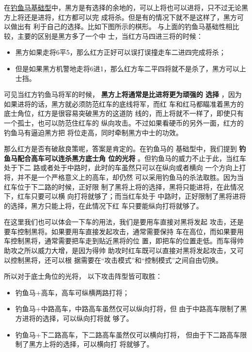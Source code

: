 \documentclass[a5paper,twoside]{book}
\begin{document}
在\hyperref[sec-3-1]{钓鱼马基础型}中，黑方是有选择的余地的，可以上将也可以进将，只不过无论黑方上将还是进将，红方都可以完
成将杀。但是有的情况下就不是这样了，黑方可以做出有
利于自己的选择。比如下图所示的棋形。
与上面的钓鱼马基础性相比较，主要的区别是黑方多了一个中
士，当红方马四进三将的时候：
\begin{itemize}
\item 黑方如果走将6平5，那么红方正好可以误打误撞走车二进四完成将杀；
\item 但是如果黑方机警地走将6进1，那么红方车二平四将就不是杀了，黑方可以上士挡。
\end{itemize}

可见当红方钓鱼马将军的时候， \textbf{黑方上将通常是比进将更为顽强的
选择} ，因为如果进将的话，黑方就必须防范红车的底线将军，而红
车和红马都瞄准着黑方的底士角位，红方是很容易突破黑方的这道防
线的，而上将就不一样了，即使只有一个孤士，也可以防范住红车的
纵向攻击。不过如果看硬币的另外一面，红方的钓鱼马有逼迫黑方把
将位走高，同时牵制黑方中士的功效。

那么红方是否有破敌良策呢，答案是肯定的。在钓鱼马的
基础型中，我们提到 \textbf{钓鱼马配合高车可以连杀黑方底士角
位的光将} 。但钓鱼马的威力不止于此，当红车处于下二
路或者处于中路时，此时的车虽然只可以在纵向或者横向
一个方向上打将，并不是一个严格意义上的高车，却仍然
可以采用钓鱼马的杀法取胜。因为当红车位于下二路的时候，正好限
制了黑将上将的选择，黑将只能进将，在此情况下，红车只要可以横
向打将就够了；而当红车处于
中路时，正好限制了黑将进将的选择，黑方只能上将，在此情况下红
车只要能纵向打将就够了。

在这里我们也可以体会一下车的用法，我们是要用车直接对黑将发起
攻击，还是要车控制黑将。如果要用车直接发起攻击，通常需要保持
车在高位，而如果要用车控制黑将，通常需要把车走到贴近黑将的位
置，即把车的位置走低。而车得帅助攻之所以威力大增，是因为得帅
助攻时红车既可以直接对黑将发起攻击，又可以控制黑将，还可以根
据需要在“攻击模式”和“控制模式”之间自由切换。

所以对于底士角位的光将，
以下攻击阵型皆可取胜：
\begin{itemize}
\item 钓鱼马+高车，高车可纵横两路打将；
\item 钓鱼马+中路高车，中路高车虽然仅可以纵向打将，但
由于中路高车限制了黑方进将的选择，可以纵向打将就
够了。
\item 钓鱼马+下二路高车，下二路高车虽然仅可以横向打将，
但由于下二路高车限制了黑方上将的选择，可以横向打
将就够了。
\end{itemize}
\end{document}
